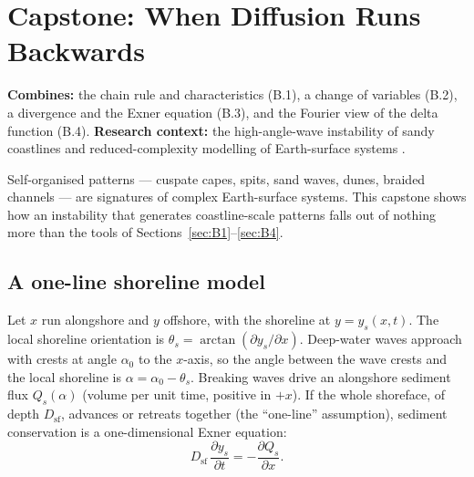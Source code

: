 \documentclass[11pt,letterpaper]{article}
\numberwithin{equation}{section}
\newcommand{\pd}[2]{\frac{\partial #1}{\partial #2}}
\begin{document}
\clearpage
\section{Capstone: When Diffusion Runs Backwards}\label{sec:capstone}
\begin{source}
\textbf{Combines:} the chain rule and characteristics (B.1), a change of variables (B.2), a divergence and the Exner equation (B.3),
and the Fourier view of the delta function (B.4). \textbf{Research context:} the high-angle-wave instability of sandy coastlines
\citep{ashton2001,ashton2006} and reduced-complexity modelling of Earth-surface systems \citep{murray2007,murray2009}.
\end{source}

Self-organised patterns --- cuspate capes, spits, sand waves, dunes, braided channels --- are signatures of complex Earth-surface
systems. This capstone shows how an instability that generates coastline-scale patterns falls out of nothing more than the tools
of Sections~\ref{sec:B1}--\ref{sec:B4}.

\subsection{A one-line shoreline model}
Let $x$ run alongshore and $y$ offshore, with the shoreline at $y=y_s(x,t)$. The local shoreline orientation is
$\theta_s=\arctan(\partial y_s/\partial x)$. Deep-water waves approach with crests at angle $\alpha_0$ to the $x$-axis, so the angle between
the wave crests and the local shoreline is $\alpha=\alpha_0-\theta_s$. Breaking waves drive an alongshore sediment flux $Q_s(\alpha)$
(volume per unit time, positive in $+x$). If the whole shoreface, of depth $D_{\mathrm{sf}}$, advances or retreats together (the
``one-line'' assumption), sediment conservation is a one-dimensional Exner equation:
\begin{equation}\label{eq:oneline}
D_{\mathrm{sf}}\,\pd{y_s}{t}=-\pd{Q_s}{x}.
\end{equation}
\end{document}

